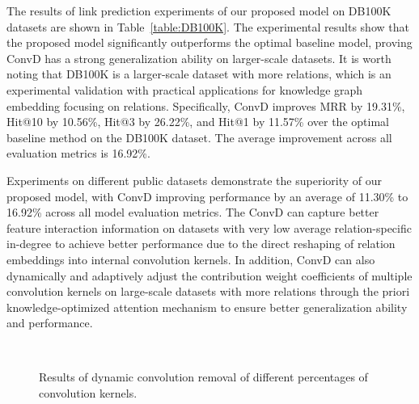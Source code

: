 \documentclass[letterpaper]{article} %
\begin{document}
The results of link prediction experiments of our proposed model on DB100K datasets are shown in Table~\ref{table:DB100K}. The experimental results show that the proposed model significantly outperforms the optimal baseline model, proving ConvD has a strong generalization ability on larger-scale datasets. It is worth noting that DB100K is a larger-scale dataset with more relations, which is an experimental validation with practical applications for knowledge graph embedding focusing on relations. Specifically, ConvD improves MRR by 19.31\%, Hit@10 by 10.56\%, Hit@3 by 26.22\%, and Hit@1 by 11.57\% over the optimal baseline method on the DB100K dataset. The average improvement across all evaluation metrics is 16.92\%.

Experiments on different public datasets demonstrate the superiority of our proposed model, with ConvD improving performance by an average of 11.30\% to 16.92\% across all model evaluation metrics. The ConvD can capture better feature interaction information on datasets with very low average relation-specific in-degree to achieve better performance due to the direct reshaping of relation embeddings into internal convolution kernels. In addition, ConvD can also dynamically and adaptively adjust the contribution weight coefficients of multiple convolution kernels on large-scale datasets with more relations through the priori knowledge-optimized attention mechanism to ensure better generalization ability and performance.


\begin{figure}[h!]
  \centering
	\\
    \caption{Results of dynamic convolution removal of different percentages of convolution kernels.}
  \label{fig:dynamic convolution}
\end{figure}
\end{document}
